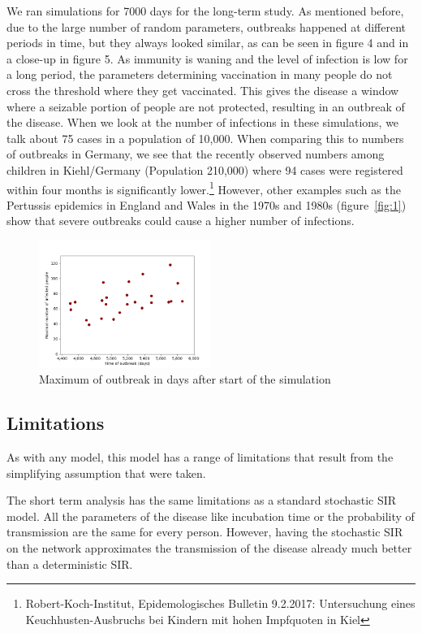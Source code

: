 \documentclass[11pt]{article}
\begin{document}
We ran simulations for 7000 days for the long-term study. As mentioned before, due to the large number of random parameters, outbreaks happened at different periods in time, but they always looked similar, as can be seen in figure 4 and in a close-up in figure 5. As immunity is waning and the level of infection is low for a long period, the parameters determining vaccination in many people do not cross the threshold where they get vaccinated. This gives the disease a window where a seizable portion of people are not protected, resulting in an outbreak of the disease. When we look at the number of infections in these simulations, we talk about 75 cases in a population of 10,000. When comparing  this to numbers of outbreaks in Germany, we see that the recently observed numbers among children in Kiehl/Germany (Population 210,000) where 94 cases were registered within four months is significantly lower.\footnote{Robert-Koch-Institut, Epidemologisches Bulletin 9.2.2017: Untersuchung eines Keuchhusten-Ausbruchs bei Kindern mit hohen Impfquoten in Kiel} However, other examples such as the Pertussis epidemics in England and Wales in the 1970s and 1980s (figure~\ref{fig:1}) show that severe outbreaks could cause a higher number of infections. 



\begin{figure}
\centering
\includegraphics[width=0.5\textwidth]{longtermoutbreak}
\caption{Maximum of outbreak in days after start of the simulation}
\label{fig:9}
\end{figure}


\subsection{Limitations}
As with any model, this model has a range of limitations that result from the simplifying assumption that were taken.

The short term analysis has the same limitations as a standard stochastic SIR model. All the parameters of the disease like incubation time or the probability of transmission are the same for every person. However, having the stochastic SIR on the network approximates the transmission of the disease already much better than a deterministic SIR.
\end{document}
